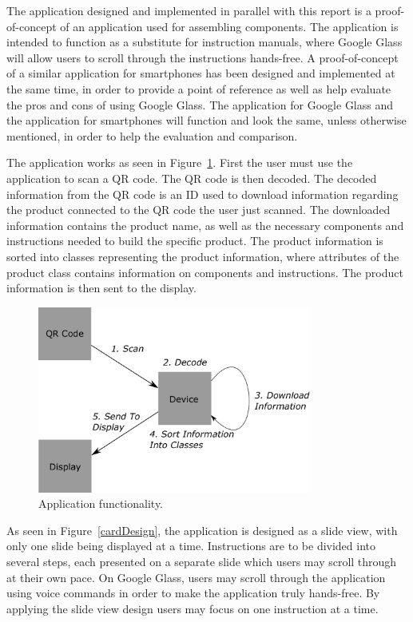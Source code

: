 The application designed and implemented in parallel with this report is a proof-of-concept of an application used for assembling components. The application is intended to function as a substitute for  instruction manuals, where Google Glass will allow users to scroll through the instructions hands-free. A proof-of-concept of a similar application for smartphones has been designed and implemented at the same time, in order to provide a point of reference as well as help evaluate the pros and cons of using Google Glass. The application for Google Glass and the application for smartphones will function and look the same, unless otherwise mentioned, in order to help the evaluation and comparison.

The application works as seen in Figure~\ref{projectmap}. First the user must use the application to scan a QR code. The QR code is then decoded. The decoded information from the QR code is an ID used to download information regarding the product connected to the QR code the user just scanned. The downloaded information contains the product name, as well as the necessary components and instructions needed to build the specific product. The product information is sorted into classes representing the product information, where attributes of the product class contains information on components and instructions.  The product information is then sent to the display.

	\begin{figure}[ht!]
		\centering
		\includegraphics[width=90mm]{images/projectmap4}
		\caption{Application functionality.}
		\label{projectmap}
	\end{figure}

As seen in Figure~\ref{cardDesign}, the application is designed as a slide view, with only one slide being displayed at a time. Instructions are to be divided into several steps, each presented on a separate slide which users may scroll through at their own pace. On Google Glass, users may scroll through the application using voice commands in order to make the application truly hands-free. By applying the slide view design users may focus on one instruction at a time. %


